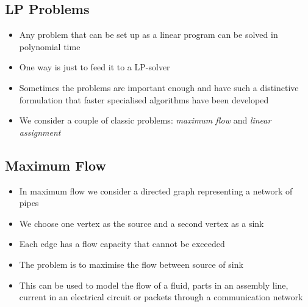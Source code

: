 \Outline %

\begin{slide}
\section{LP Problems}

\begin{PauseHighLight}
  \begin{itemize}
  \item Any problem that can be set up as a linear program can be solved
    in polynomial time\pause
  \item One way is just to feed it to a LP-solver\pause
  \item Sometimes the problems are important enough and have such a
    distinctive formulation that faster specialised algorithms have been
    developed\pause
  \item We consider a couple of classic problems: \textit{maximum flow}
    and \textit{linear assignment}\pause
  \end{itemize}
\end{PauseHighLight}

\end{slide}


\begin{slide}
\section{Maximum Flow}

\begin{PauseHighLight}
  \begin{itemize}
  \item In maximum flow we consider a directed graph representing a
    network of pipes\pause
  \item We choose one vertex as the source and a second vertex as a
    sink\pause
  \item Each edge has a flow capacity that cannot be exceeded\pause
  \item The problem is to maximise the flow between source of sink\pause
  \item This can be used to model the flow of a fluid, parts in an
    assembly line, current in an electrical circuit or packets through a
    communication network\pause
  \end{itemize}
\end{PauseHighLight}

\end{slide}

